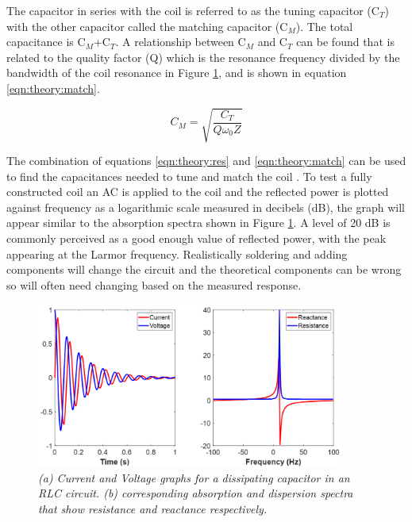 The capacitor in series with the coil is referred to as the tuning capacitor (C$_T$) with the other capacitor called the matching capacitor (C$_M$). The total capacitance is C$_M$+C$_T$. A relationship between C$_M$ and C$_T$ can be found that is related to the quality factor (Q) \cite{Chen1989ChapterNoise} which is the resonance frequency divided by the bandwidth of the coil resonance in Figure \ref{fig:theory:VI}, and is shown in equation \ref{eqn:theory:match}. 

\begin{equation}
    C_M = \sqrt{\frac{C_T}{Q\omega_0Z}}
    \label{eqn:theory:match}
\end{equation}

The combination of equations \ref{eqn:theory:res} and \ref{eqn:theory:match} can be used to find the capacitances needed to tune and match the coil \cite{Chen1989ChapterNoise}. To test a fully constructed coil an \ac{AC} is applied to the coil and the reflected power is plotted against frequency as a logarithmic scale measured in decibels (dB), the graph will appear similar to the absorption spectra shown in Figure \ref{fig:theory:VI}. A level of 20 dB is commonly perceived as a good enough value of reflected power, with the peak appearing at the Larmor frequency. Realistically soldering and adding components will change the circuit and the theoretical components can be wrong so will often need changing based on the measured response.

\begin{figure}
    \centering
    \includegraphics[width=0.9\textwidth]{Figures/Theory/VI.png}
    \caption{\textit{(a) Current and Voltage graphs for a dissipating capacitor in an RLC circuit. (b) corresponding absorption and dispersion spectra that show resistance and reactance respectively.}}
    \label{fig:theory:VI}
\end{figure}

